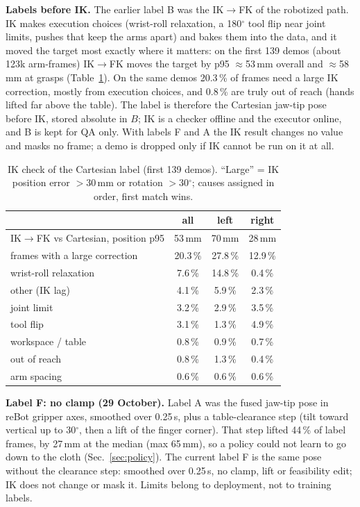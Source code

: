 \documentclass[conference,10pt]{IEEEtran}
\newcommand{\mm}{\,mm\xspace}
\begin{document}
\textbf{Labels before IK.} The earlier label B was the IK$\to$FK of the robotized path. IK makes execution choices
(wrist-roll relaxation, a 180$^\circ$ tool flip near joint limits, pushes that keep the arms apart) and bakes them into
the data, and it moved the target most exactly where it matters: on the first 139 demos (about 123k arm-frames) IK$\to$FK
moves the target by p95 $\approx$53\mm overall and $\approx$58\mm at grasps (Table~\ref{tab:ikqa}). On the same demos
20.3\,\% of frames need a large IK correction, mostly from execution choices, and 0.8\,\% are truly out of reach (hands
lifted far above the table). The label is therefore the Cartesian jaw-tip pose before IK, stored absolute in $B$; IK is
a checker offline and the executor online, and B is kept for QA only. With labels F and A the IK result changes no value
and masks no frame; a demo is dropped only if IK cannot be run on it at all.

\begin{table}[t]
\caption{IK check of the Cartesian label (first 139 demos). ``Large'' = IK position error $>$30\mm or rotation
$>$30$^\circ$; causes assigned in order, first match wins.}\label{tab:ikqa}
\centering\small
\begin{tabular}{@{}lccc@{}}
\toprule
 & all & left & right \\
\midrule
IK$\to$FK vs Cartesian, position p95 & 53\mm & 70\mm & 28\mm \\
frames with a large correction & 20.3\,\% & 27.8\,\% & 12.9\,\% \\
\quad wrist-roll relaxation & 7.6\,\% & 14.8\,\% & 0.4\,\% \\
\quad other (IK lag) & 4.1\,\% & 5.9\,\% & 2.3\,\% \\
\quad joint limit & 3.2\,\% & 2.9\,\% & 3.5\,\% \\
\quad tool flip & 3.1\,\% & 1.3\,\% & 4.9\,\% \\
\quad workspace / table & 0.8\,\% & 0.9\,\% & 0.7\,\% \\
\quad out of reach & 0.8\,\% & 1.3\,\% & 0.4\,\% \\
\quad arm spacing & 0.6\,\% & 0.6\,\% & 0.6\,\% \\
\bottomrule
\end{tabular}
\end{table}

\textbf{Label F: no clamp (29 October).} Label A was the fused jaw-tip pose in reBot gripper axes, smoothed over
0.25\,s, plus a table-clearance step (tilt toward vertical up to 30$^\circ$, then a lift of the finger corner). That step
lifted 44\,\% of label frames, by 27\mm at the median (max 65\mm), so a policy could not learn to go down to the cloth
(Sec.~\ref{sec:policy}). The current label F is the same pose without the clearance step: smoothed over 0.25\,s, no
clamp, lift or feasibility edit; IK does not change or mask it. Limits belong to deployment, not to training labels.
\end{document}
